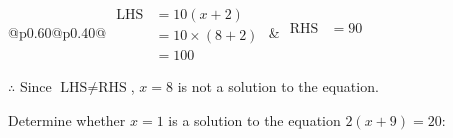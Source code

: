 \documentclass[12pt]{article}
\newcounter{minipagecount}
\begin{document}
\begin{multicols}{2}
\begin{minipage}[t]{0.40\textwidth}
    \renewcommand{\arraystretch}{1.3} %
    \begin{tabular}{@{}p{0.60\linewidth}@{}p{0.40\linewidth}@{}}
        \(\begin{aligned}
            \text{LHS} &= 10(x + 2) \\
                    &= 10 \times(8 + 2) \\
                    &= 100
        \end{aligned}\) &
        \(\begin{aligned}
            \text{RHS} &= 90\\
                    & \\
                    &
        \end{aligned}\)
    \end{tabular}
    \renewcommand{\arraystretch}{1.0} %
    \vspace{2pt}  %

    \noindent \(\therefore\) Since \(\text{LHS} \neq \text{RHS}\), \(x = 8\) is not  a solution to the equation.

\end{minipage}

 \vspace*{16pt}
\noindent{(\theminipagecount)}\hspace{0.1mm} %
\begin{minipage}[t]{0.40\textwidth} %

    \noindent Determine whether \(x = 1\) is a solution to the equation \(2(x + 9) = 20\):
    \vspace{4pt}  %

    \noindent


\end{minipage}
\end{multicols}
\end{document}
